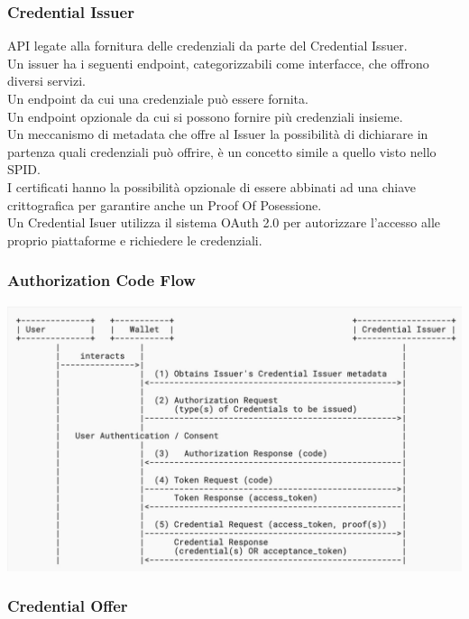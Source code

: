 \subsubsection{Credential Issuer}
API legate alla fornitura delle credenziali da parte del Credential Issuer.
\\Un issuer ha i seguenti endpoint, categorizzabili come interfacce, che offrono diversi servizi.
\\Un endpoint da cui una credenziale può essere fornita.
\\Un endpoint opzionale da cui si possono fornire più credenziali insieme.
\\Un meccanismo di metadata che offre al Issuer la possibilità di dichiarare in partenza quali credenziali può offrire, è un concetto simile a quello visto nello SPID.
\\I certificati hanno la possibilità opzionale di essere abbinati ad una chiave crittografica per garantire anche un Proof Of Posessione.
\\Un Credential Isuer utilizza il sistema OAuth 2.0 per autorizzare l'accesso alle proprio piattaforme e richiedere le credenziali.

\subsubsection{Authorization Code Flow}
\begin{center}
	\includegraphics[scale = 0.3]{./res/images/AuthorizationCodeFlow.jpg}
\end{center}

\subsubsection{Credential Offer}


